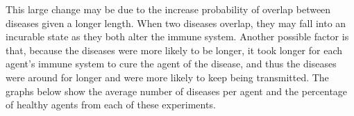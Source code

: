 \documentclass[12pt,a4paper]{article} %
\begin{document}
    This large change may be due to the increase probability of overlap between diseases given a longer length. When two diseases overlap, they may fall into an incurable state as they both alter the immune system.
    Another possible factor is that, because the diseases were more likely to be longer, it took longer for each
    agent's immune system to cure the agent of the disease, and thus the diseases were around for longer and were more likely
    to keep being transmitted. The graphs below show the average number of diseases per agent and the percentage of healthy
    agents from each of these experiments.
    
    
\end{document}
